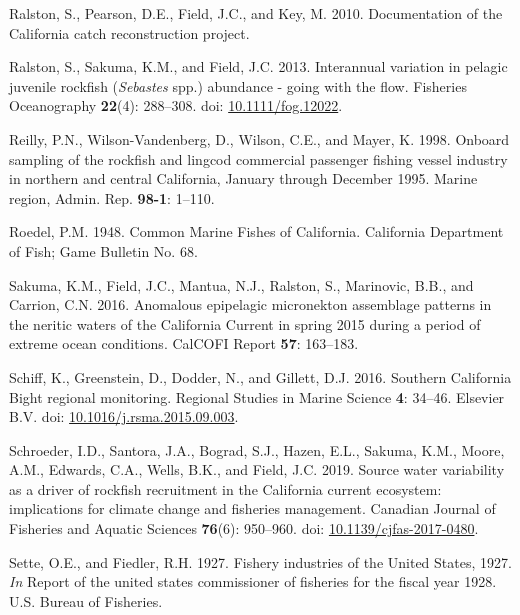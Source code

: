 \documentclass[11pt,
  english,
  a4paper,
]{article}
\newlength{\cslhangindent}
\newenvironment{CSLReferences}[2] %
 {%
  \setlength{\parindent}{0pt}
  \ifodd #1 \everypar{\setlength{\hangindent}{\cslhangindent}}\ignorespaces\fi
  \ifnum #2 > 0
  \setlength{\parskip}{#2\baselineskip}
  \fi
 }%
 {}
\begin{document}
\begin{CSLReferences}{1}{0}
\leavevmode{}%
Ralston, S., Pearson, D.E., Field, J.C., and Key, M. 2010. {Documentation of the California catch reconstruction project}.

\leavevmode{}%
Ralston, S., Sakuma, K.M., and Field, J.C. 2013. {Interannual variation in pelagic juvenile rockfish (\emph{Sebastes} spp.) abundance - going with the flow}. Fisheries Oceanography \textbf{22}(4): 288--308. doi: \href{https://doi.org/10.1111/fog.12022}{10.1111/fog.12022}.

\leavevmode{}%
Reilly, P.N., Wilson-Vandenberg, D., Wilson, C.E., and Mayer, K. 1998. {Onboard sampling of the rockfish and lingcod commercial passenger fishing vessel industry in northern and central California, January through December 1995.} Marine region, Admin. Rep. \textbf{98-1}: 1--110.

\leavevmode{}%
Roedel, P.M. 1948. {Common Marine Fishes of California}. California Department of Fish; Game Bulletin No. 68.

\leavevmode{}%
Sakuma, K.M., Field, J.C., Mantua, N.J., Ralston, S., Marinovic, B.B., and Carrion, C.N. 2016. {Anomalous epipelagic micronekton assemblage patterns in the neritic waters of the California Current in spring 2015 during a period of extreme ocean conditions}. CalCOFI Report \textbf{57}: 163--183.

\leavevmode{}%
Schiff, K., Greenstein, D., Dodder, N., and Gillett, D.J. 2016. {Southern California Bight regional monitoring}. Regional Studies in Marine Science \textbf{4}: 34--46. Elsevier B.V. doi: \href{https://doi.org/10.1016/j.rsma.2015.09.003}{10.1016/j.rsma.2015.09.003}.

\leavevmode{}%
Schroeder, I.D., Santora, J.A., Bograd, S.J., Hazen, E.L., Sakuma, K.M., Moore, A.M., Edwards, C.A., Wells, B.K., and Field, J.C. 2019. {Source water variability as a driver of rockfish recruitment in the California current ecosystem: implications for climate change and fisheries management}. Canadian Journal of Fisheries and Aquatic Sciences \textbf{76}(6): 950--960. doi: \href{https://doi.org/10.1139/cjfas-2017-0480}{10.1139/cjfas-2017-0480}.

\leavevmode{}%
Sette, O.E., and Fiedler, R.H. 1927. {Fishery industries of the United States, 1927}. \emph{In} Report of the united states commissioner of fisheries for the fiscal year 1928. U.S. Bureau of Fisheries.


\end{CSLReferences}
\end{document}
